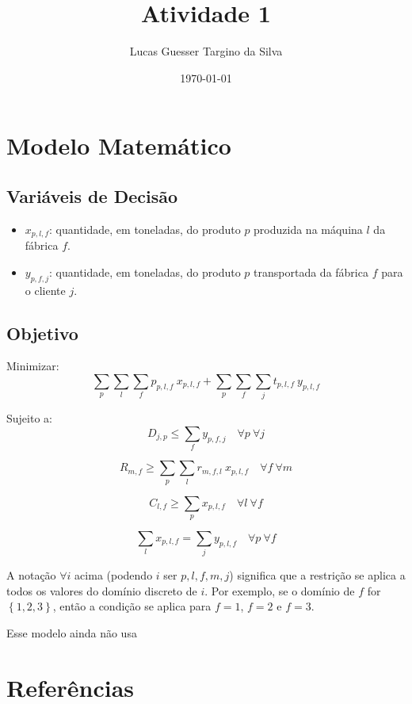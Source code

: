 \documentclass{article}
\title{Atividade 1}
\author{Lucas Guesser Targino da Silva}
\date{\today}
\newcommand{\Set}[1]{$\left\{#1\right\}$}
\newcommand{\Sum}[1]{\displaystyle\sum\limits_{#1}}
\begin{document}
\maketitle

\section{Modelo Matemático}

\subsection{Variáveis de Decisão}

\begin{itemize}
	\item $x_{p,l,f}$: quantidade, em toneladas, do produto $p$ produzida na máquina $l$ da fábrica $f$.
	\item $y_{p,f,j}$: quantidade, em toneladas, do produto $p$ transportada da fábrica $f$ para o cliente $j$.
\end{itemize}


\subsection{Objetivo}

Minimizar:
\begin{equation}
 	\Sum{p}\Sum{l}\Sum{f} p_{p,l,f} \  x_{p,l,f}
	+
	\Sum{p}\Sum{f}\Sum{j} t_{p,l,f} \  y_{p,l,f}
\end{equation}

Sujeito a:
\begin{equation}
	\label{constraint:demand}
	D_{j,p} \leq \Sum{f} y_{p,f,j}
	\quad \forall p \ \forall j
\end{equation}

\begin{equation}
	\label{constraint:resources}
	R_{m,f} \geq \Sum{p} \Sum{l} r_{m,f,l} \ x_{p,l,f}
	\quad \forall f \ \forall m
\end{equation}

\begin{equation}
	\label{constraint:production-capacity}
	C_{l,f} \geq \Sum{p} x_{p,l,f}
	\quad \forall l \ \forall f
\end{equation}

\begin{equation}
	\label{constraint:compatibility}
	\Sum{l} x_{p,l,f} = \Sum{j} y_{p,l,f}
	\quad \forall p \ \forall f
\end{equation}

A notação $\forall i$ acima (podendo $i$ ser $p, l, f, m, j$) significa que a restrição se aplica a todos os valores do domínio discreto de $i$. Por exemplo, se o domínio de $f$ for \Set{1, 2, 3}, então a condição se aplica para $f=1$, $f=2$ e $f=3$.


Esse modelo ainda não usa \cite{bib:gurobi}

\section{Referências}



\end{document}
